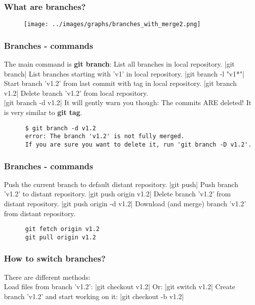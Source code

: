 \begin{frame}
\frametitle{What are branches?}
   \begin{figure}
      \centering
      \texttt{[image: ../images/graphs/branches\_with\_merge2.png]}
   \end{figure}
\end{frame}

\begin{frame}[fragile]
\frametitle{Branches - commands}
   \scriptsize
   The main command is {\bf git branch}:
   List all branches in local repository.
   |git branch|
   List branches starting with 'v1' in local repository.
   |git branch -l "v1*"|
   Start branch 'v1.2' from last commit with tag  in local repository.
   |git branch v1.2|
   Delete branch 'v1.2' from local repository. \\
   |git branch -d v1.2|
   It will gently warn you though:
   \alert{The commits ARE deleted!}
   It is very similar to {\bf git tag}.
   \begin{verbatim}
      $ git branch -d v1.2
      error: The branch 'v1.2' is not fully merged.
      If you are sure you want to delete it, run 'git branch -D v1.2'.
   \end{verbatim}
\end{frame}

\begin{frame}[fragile]
\frametitle{Branches - commands}
   Push the current branch to default distant repository.
   |git push|
   Push branch 'v1.2' to distant repository.
   |git push origin v1.2|
   Delete branch 'v1.2' from distant repository.
   |git push origin -d v1.2|
   Download (and merge) branch 'v1.2' from distant repository.
   \begin{verbatim}
      git fetch origin v1.2
      git pull origin v1.2
   \end{verbatim}
\end{frame}

\begin{frame}
\frametitle{How to switch branches?}
   There are different methods:\\
   Load files from branch 'v1.2':
   |git checkout v1.2|
   Or:
   |git switch v1.2|
   Create branch 'v1.2' and start working on it:
   |git checkout -b v1.2|
\end{frame}

